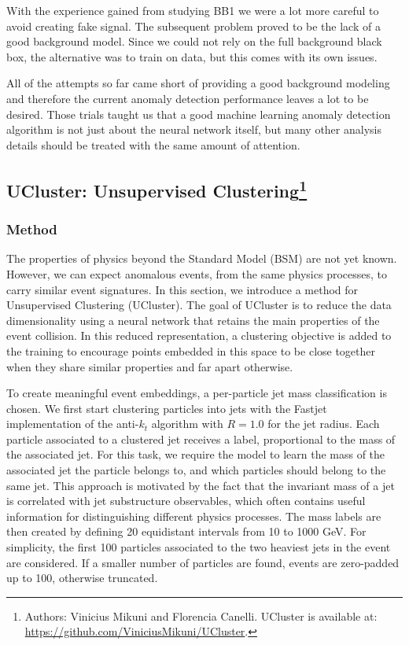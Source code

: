 \documentclass[a4paper,11pt]{article}
\begin{document}
With the experience gained from studying BB1 we were a lot more careful to avoid creating fake signal. The subsequent problem proved to be the lack of a good background model. Since we could not rely on the full background black box, the alternative was to train on data, but this comes with its own issues. 

All of the attempts so far came short of providing a good background modeling and therefore the current anomaly detection performance leaves a lot to be desired. Those trials taught us that a good machine learning anomaly detection algorithm is not just about the neural network itself, but many other analysis details should be treated with the same amount of attention.

 \FloatBarrier
\subsection[UCluster: Unsupervised Clustering]{UCluster: Unsupervised Clustering\footnote{Authors: Vinicius Mikuni and Florencia Canelli.  UCluster is available at: \href{https://github.com/ViniciusMikuni/UCluster}{https://github.com/ViniciusMikuni/UCluster}.}}

\label{sec:ucluster}

\subsubsection{Method}
\label{sec:method}

The properties of physics beyond the Standard Model (BSM) are not yet known. However,
we can expect anomalous events, from the same physics processes, to carry similar event signatures. In this section, we introduce a method for Unsupervised Clustering (UCluster). The goal of UCluster is to reduce the data dimensionality using a neural network that retains the main properties of the event collision. In this reduced representation, a clustering objective is added to the training to encourage points embedded in this space to be close together when they share similar properties and far apart otherwise. 

To create meaningful event embeddings, a per-particle jet mass classification is chosen.
We first start clustering particles into jets with the Fastjet implementation of the anti-$k_t$ algorithm with $R = 1.0$ for the jet radius. Each particle associated to a clustered jet receives a label, proportional to the mass of the associated jet. For this task, we require the model to learn the mass of the associated jet the particle belongs to, and which particles should belong to the same jet. This approach is motivated by the fact that the invariant mass of a jet is correlated with jet substructure observables, which often contains useful information for distinguishing different physics processes. The mass labels are then created by defining 20 equidistant intervals from 10 to 1000 GeV. For simplicity, the first 100 particles associated to the two heaviest jets in the event are considered. If a smaller number of particles are found, events are zero-padded up to 100, otherwise truncated. 
\end{document}
